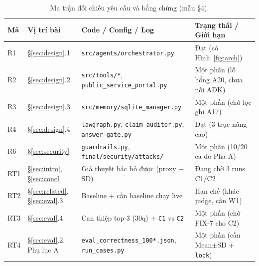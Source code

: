 \documentclass[sigconf,nonacm]{acmart}
\begin{document}
\begin{table}[H]
\caption{Ma trận đối chiếu yêu cầu và bằng chứng (mẫu §4).}
\label{tab:req}
\scriptsize
\begin{tabular}{@{}p{1.0cm}p{1.6cm}p{2.7cm}p{2.1cm}@{}}
\toprule
\textbf{Mã} & \textbf{Vị trí bài} & \textbf{Code / Config / Log} & \textbf{Trạng thái / Giới hạn} \\
\midrule
R1 & §\ref{sec:design}.1 & \texttt{src/agents/orchestrator.py} & Đạt (có Hình~\ref{fig:arch}) \\
R2 & §\ref{sec:design}.2 & \texttt{src/tools/*}, \texttt{public\_service\_portal.py} & Một phần (lỗ hổng A20, chưa nối ADK) \\
R3 & §\ref{sec:design}.3 & \texttt{src/memory/sqlite\_manager.py} & Một phần (chờ lọc ghi A17) \\
R4 & §\ref{sec:design}.4 & \texttt{lawgraph.py}, \texttt{claim\_auditor.py}, \texttt{answer\_gate.py} & Đạt (3 trục nâng cao) \\
R6 & §\ref{sec:security} & \texttt{guardrails.py}, \texttt{final/security/attacks/} & Một phần (10/20 ca đo Pha A) \\
\midrule
RT1 & §\ref{sec:intro}, §\ref{sec:concl} & Giả thuyết bác bỏ được (proxy + SD) & Đang chờ 3 runs C1/C2 \\
RT2 & §\ref{sec:related}, §\ref{sec:eval}.3 & Baseline \cite{phan2026sbv} + cần baseline chạy live & Hạn chế (khác judge, cần W1) \\
RT3 & §\ref{sec:eval}.4 & Can thiệp top-3 (30q) + \texttt{C1} vs \texttt{C2} & Một phần (chờ FIX-7 cho C2) \\
RT4 & §\ref{sec:eval}.2, Phụ lục A & \texttt{eval\_correctness\_100*.json}, \texttt{run\_cases.py} & Một phần (cần Mean$\pm$SD + \texttt{lock}) \\
\bottomrule
\end{tabular}
\end{table}
\end{document}
